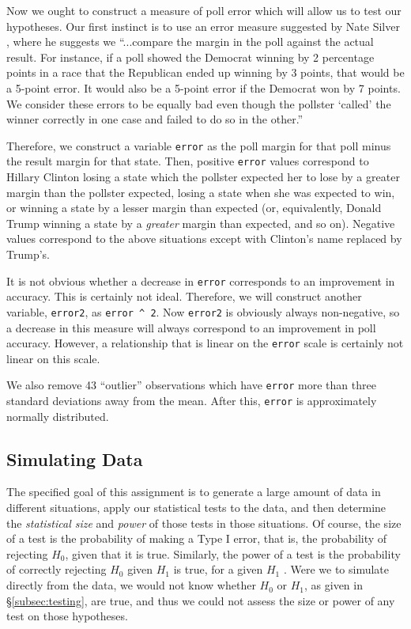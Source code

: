 \documentclass[11pt, oneside]{article}
\newcommand \Rcode[1]{{\texttt{\colorbox{codegray}{#1}}}}
\begin{document}
Now we ought to construct a measure of poll error which will allow us to test our hypotheses. Our first instinct is to use an error measure suggested by Nate Silver \cite{silver}, where he suggests we ``...compare the margin in the poll against the actual result. For instance, if a poll showed the Democrat winning by 2 percentage points in a race that the Republican ended up winning by 3 points, that would be a 5-point error. It would also be a 5-point error if the Democrat won by 7 points. We consider these errors to be equally bad even though the pollster `called' the winner correctly in one case and failed to do so in the other.''

Therefore, we construct a variable \Rcode{error} as the poll margin for that poll minus the result margin for that state. Then, positive \Rcode{error} values correspond to Hillary Clinton losing a state which the pollster expected her to lose by a greater margin than the pollster expected, losing a state when she was expected to win, or winning a state by a lesser margin than expected (or, equivalently, Donald Trump winning a state by a \emph{greater} margin than expected, and so on). Negative values correspond to the above situations except with Clinton's name replaced by Trump's. 

It is not obvious whether a decrease in \Rcode{error} corresponds to an improvement in accuracy. This is certainly not ideal. Therefore, we will construct another variable, \Rcode{error2}, as \Rcode{error \^{} 2}. Now \Rcode{error2} is obviously always non-negative, so a decrease in this measure will always correspond to an improvement in poll accuracy. However, a relationship that is linear on the \Rcode{error} scale is certainly not linear on this scale. 

We also remove 43 ``outlier'' observations which have \Rcode{error} more than three standard deviations away from the mean. After this, \Rcode{error} is approximately normally distributed. 

\subsection{Simulating Data}

The specified goal of this assignment is to generate a large amount of data in different situations, apply our statistical tests to the data, and then determine the \emph{statistical size} and \emph{power} of those tests in those situations. Of course, the size of a test is the probability of making a Type I error, that is, the probability of rejecting $H_0$, given that it is true. Similarly, the power of a test is the probability of correctly rejecting $H_0$ given $H_1$ is true, for a given $H_1$ \cite{spec}. Were we to simulate directly from the data, we would not know whether $H_0$ or $H_1$, as given in \S\ref{subsec:testing}, are true, and thus we could not assess the size or power of any test on those hypotheses. 
\end{document}
